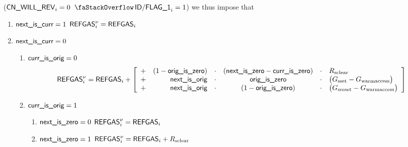 \begin{description}
		\If \Big($\textsf{CN}\textsf{\_WILL\_REV}_{i} = 0$ \et $\decFlag{1}_{i} = 1$\Big) \Then we thus impose that
		\begin{enumerate}
			\item \If $\textsf{next\_is\_curr} = 1$ \Then $\textsf{REFGAS}^{\nu}_{i} = \textsf{REFGAS}_{i}$
			\item \If $\textsf{next\_is\_curr} = 0$ \Then
				\begin{enumerate}
					\item \If $\textsf{curr\_is\_orig} = 0$ \Then
						\[
							\textsf{REFGAS}^{\nu}_{i} = \textsf{REFGAS}_{i} 
							+
							\left[ \begin{array}{crcccl}
								+ & (1 - \textsf{orig\_is\_zero}) & \cdot & (\textsf{next\_is\_zero} - \textsf{curr\_is\_zero}) & \cdot & R_\text{sclear}                                 \\
								+ & \textsf{next\_is\_orig}       & \cdot & \textsf{orig\_is\_zero}                    & \cdot & \big(G_\text{sset} - G_\text{warmaccess}\big)   \\
								+ & \textsf{next\_is\_orig}       & \cdot & (1 -\textsf{orig\_is\_zero})               & \cdot & \big(G_\text{sreset} - G_\text{warmaccess}\big) \\
							\end{array} \right]
						\]
						\item \If $\textsf{curr\_is\_orig} = 1$ \Then
							\begin{enumerate}
								\item \If $\textsf{next\_is\_zero} = 0$ \Then $\textsf{REFGAS}^{\nu}_{i} = \textsf{REFGAS}_{i}$
								\item \If $\textsf{next\_is\_zero} = 1$ \Then $\textsf{REFGAS}^{\nu}_{i} = \textsf{REFGAS}_{i} + R_\text{sclear}$
							\end{enumerate}
				\end{enumerate}
		\end{enumerate}
\end{description}

